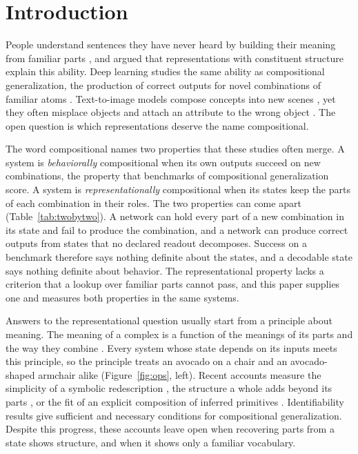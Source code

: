 \documentclass[10pt]{article}
\theoremstyle{plain}
\theoremstyle{remark}
\begin{document}
\section{Introduction}
\label{sec:intro}

People understand sentences they have never heard by building their meaning from familiar parts \citep{frege1923}, and \citet{fodor1988} argued that representations with constituent structure explain this ability. Deep learning studies the same ability as compositional generalization, the production of correct outputs for novel combinations of familiar atoms \citep{lake2018,keysers2020,kim2020cogs}. Text-to-image models compose concepts into new scenes \citep{ramesh2021,okawa2023}, yet they often misplace objects \citep{conwell2022} and attach an attribute to the wrong object \citep{rassin2022}. The open question is which representations deserve the name compositional.

The word compositional names two properties that these studies often merge. A system is \emph{behaviorally} compositional when its own outputs succeed on new combinations, the property that benchmarks of compositional generalization score. A system is \emph{representationally} compositional when its states keep the parts of each combination in their roles. The two properties can come apart (Table~\ref{tab:twobytwo}). A network can hold every part of a new combination in its state and fail to produce the combination, and a network can produce correct outputs from states that no declared readout decomposes. Success on a benchmark therefore says nothing definite about the states, and a decodable state says nothing definite about behavior. The representational property lacks a criterion that a lookup over familiar parts cannot pass, and this paper supplies one and measures both properties in the same systems.

Answers to the representational question usually start from a principle about meaning. The meaning of a complex is a function of the meanings of its parts and the way they combine \citep{montague1970}. Every system whose state depends on its inputs meets this principle, so the principle treats an avocado on a chair and an avocado-shaped armchair alike (Figure~\ref{fig:ops}, left). Recent accounts measure the simplicity of a symbolic redescription \citep{elmoznino2024}, the structure a whole adds beyond its parts \citep{elmoznino2026}, or the fit of an explicit composition of inferred primitives \citep{andreas2019}. Identifiability results give sufficient \citep{lachapelle2023,wiedemer2024} and necessary \citep{uselis2026} conditions for compositional generalization. Despite this progress, these accounts leave open when recovering parts from a state shows structure, and when it shows only a familiar vocabulary.
\end{document}
